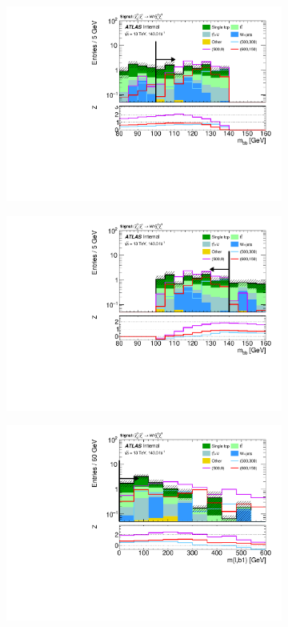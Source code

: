 \begin{figure}
\begin{subfigure}[b]{0.4\linewidth}
		\centering\includegraphics[width=\textwidth]{n1_SRMM_mct_bins/mbb_lower.pdf}
		\caption{\label{fig:Wh_reopt_second_round_n1_srmm_mbb_lower}}
	\end{subfigure}%
	\begin{subfigure}[b]{0.4\linewidth}
		\centering\includegraphics[width=\textwidth]{n1_SRMM_mct_bins/mbb_upper.pdf}
		\caption{\label{fig:Wh_reopt_second_round_n1_srmm_mbb_upper}}
	\end{subfigure}
	\begin{subfigure}[b]{0.4\linewidth}
		\centering\includegraphics[width=\textwidth]{n1_SRMM_mct_bins/mlb1.pdf}

\end{subfigure}
\end{figure}
